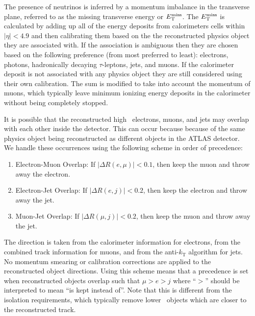The presence of neutrinos is inferred by a momentum
imbalance in the transverse plane, referred to as the missing
transverse energy or $E_{\mathrm{T}}^{\mathrm{miss}}$. The $E_{\mathrm{T}}^{\mathrm{miss}}$ is calculated by 
adding up all of 
the energy deposits from calorimeters cells within $|\eta| < 4.9$
and then calibrating them based on the the reconstructed
physics object they are associated with.
If the association is ambiguous then they are chosen based on the following
preference (from most preferred to least): electrons, photons, 
hadronically decaying $\tau$-leptons, jets, and muons.
If the calorimeter deposit is not associated with any physics object
they are still considered using their own calibration.
The sum is modified to take into account the momentum of muons,
which typically leave minimum ionizing energy deposits
in the calorimeter without being completely stopped.



It is possible that the reconstructed high \pt~electrons, muons, and jets
may overlap with each other inside the detector.  This can occur
because because of the same physics object being reconstructed as different
objects in the ATLAS detector.  
We handle these occurrences using the following
scheme in order of precedence:
\begin{enumerate}
	\item Electron-Muon Overlap: If $|\Delta R(e,\mu)| < 0.1$, 
	then keep the muon and throw away the electron.
	\item Electron-Jet Overlap: If $|\Delta R(e,j)| < 0.2$, 
	then keep the electron and throw away the jet.
	\item Muon-Jet Overlap: If $|\Delta R(\mu,j)| < 0.2$, 
	then keep the muon and throw away the jet.
\end{enumerate}
The direction is taken from the calorimeter information for electrons,
from the combined track information for muons, and from the anti-$k_{\mathrm{T}}$
algorithm for jets.
No momentum smearing or calibration corrections
are applied to the reconstructed object directions. 
Using this scheme means that a precedence is set when 
reconstructed objects overlap such that $\mu > e > j$ where ``$>$'' should
be interpreted to mean ``is kept instead of''. 
Note that this is different from the isolation requirements, which
typically remove lower \pt~objects which are closer to the reconstructed
track.



